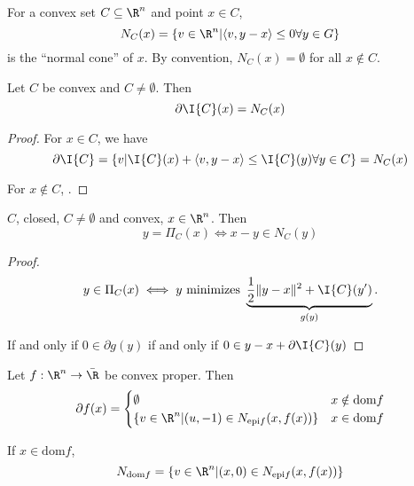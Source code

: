 \begin{defn}
  \label{defn:cones_and_generalized_inequalities:3}
  For a convex set $C \subseteq \R^{n}$ and point $x \in C$,
  \begin{equation}
    \label{eq:33}
    N_{C}(x) = \{ v \in \R^{n} | \langle v, y -x \rangle \leq 0
    \forall y \in G \}
  \end{equation} is the ``normal cone'' of $x$.  By convention,
  $N_{C}(x) = \emptyset$ for all $x \notin C$.
\end{defn}

\begin{proposition}
  Let $C$ be convex and $C \neq \emptyset$.  Then
  \begin{equation}
    \label{eq:34}
    \partial \I{C}(x) = N_{C}(x)
  \end{equation}
\end{proposition}

\begin{proof}
  For $x \in C$, we have
  \begin{equation}
    \label{eq:35}
    \partial \I{C} = \{ v | \I{C}(x) + \langle v, y - x \rangle \leq
    \I{C}(y) \forall y \in C \} = N_{C}(x)
  \end{equation}

  For $x \notin C$, .
\end{proof}


\begin{proposition}
  $C$, closed, $C \neq \emptyset$ and convex, $x \in \R^{n}$.  Then
  \begin{equation}
    \label{eq:36}
    y = \Pi_{C}(x) \iff x - y \in N_{C}(y)
  \end{equation}
\end{proposition}

\begin{proof}
  \begin{equation}
    \label{eq:37}
    y \in \Pi_{C}(x) \iff y \text{ minimizes } \underbrace{\frac{1}{2} \| y - x \|^{2} + \I{C}(y')}_{g(y)}.
  \end{equation}

  If and only if $0 \in \partial g(y)$ if and only if $0 \in y - x
  + \partial \I{C}(y)$
\end{proof}

\begin{proposition}
  Let $f: \R^{n} \rightarrow \bar \R$ be convex proper.  Then
  \begin{equation}
    \label{eq:38}
    \partial f(x) =
    \begin{cases}
      \emptyset & x \notin \text{dom} f \\
      \{ v \in \R^{n} | (u, -1) \in N_{\text{epi} f} (x, f(x))\} & x
      \in \text{dom} f
    \end{cases} 
  \end{equation}

  If $x \in \text{dom} f$,
  \begin{equation}
    \label{eq:39}
    N_{\text{dom} f} = \{ v \in \R^{n} | (x, 0) \in N_{\text{epi} f}
    (x, f(x)) \}
  \end{equation}
\end{proposition}

